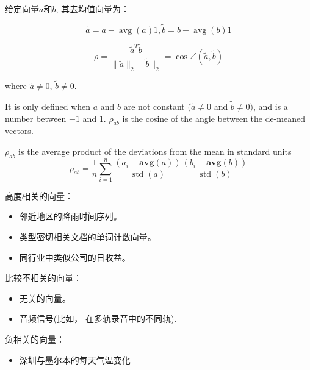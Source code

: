 给定向量$a$和$b$, 其去均值向量为：

\begin{equation} \tilde{a}=a-\operatorname{avg}(a) 1,  \tilde{b}=b-\operatorname{avg}(b) 1 \end{equation}

\begin{definition}[$a$和$b$的相关系数]
    \begin{equation} \rho=\frac{\tilde{a}^{T} \tilde{b}}{\|\tilde{a}\|_{2}\|\tilde{b}\|_{2}} = \cos \angle (\tilde{a}, \tilde{b}) \end{equation}

    where  $ \tilde{a} \neq 0 $,  $ \tilde{b} \neq 0 $.
\end{definition}

It is only defined when $ a $ and $ b $ are not constant $ (\tilde{a} \neq 0 $ and $ \tilde{b} \neq 0) $, and is a number between $ -1 $ and $1$. $ \rho_{a b} $ is the cosine of the angle between the de-meaned vectors.

\begin{theorem}
    $ \rho_{a b} $ is the average product of the deviations from the mean in standard units
\begin{equation}
\rho_{a b}=\frac{1}{n} \sum_{i=1}^{n} \frac{\left(a_{i}-\mathbf{a v g}(a)\right)}{\operatorname{std}(a)} \frac{\left(b_{i}-\mathbf{a v g}(b)\right)}{\operatorname{std}(b)}
\end{equation}
\end{theorem}


\begin{example}
    高度相关的向量：
\begin{itemize}
    \item 邻近地区的降雨时间序列。 
    \item 类型密切相关文档的单词计数向量。 
    \item 同行业中类似公司的日收益。 
\end{itemize}

比较不相关的向量：
\begin{itemize}
    \item 无关的向量。 
    \item 音频信号(比如， 在多轨录音中的不同轨). 
\end{itemize}

负相关的向量：
\begin{itemize}
    \item 深圳与墨尔本的每天气温变化
\end{itemize}
\end{example}

